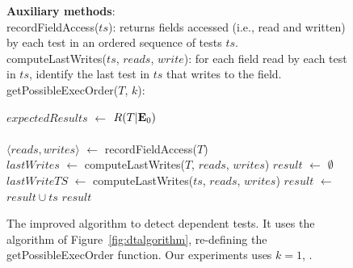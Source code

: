 
\begin{figure}[t]
\textbf{Auxiliary methods}:\\
recordFieldAccess($ts$): returns fields accessed (i.e., read and written) by each test in an ordered sequence of tests $ts$. \\
computeLastWrites($ts$, $reads$, $write$): for each field read by each test in $ts$, identify the last test in $ts$ that writes to the field.\\


getPossibleExecOrder($T$, $k$):\\
\vspace{-5mm}
\begin{algorithmic}[1]
\STATE $\mathit{expectedResults}$ $\leftarrow$ $R(T|\mathbf{E}_0)$\\
\\
\STATE $\langle reads, writes\rangle$ $\leftarrow$ recordFieldAccess($T$)
\\
\STATE $\mathit{lastWrites}$ $\leftarrow$ computeLastWrites($T$, $\mathit{reads}$, $\mathit{writes}$)
\STATE $\mathit{result}$ $\leftarrow$ $\emptyset$
\STATE $\mathit{lastWriteTS}$ $\leftarrow$ computeLastWrites($ts$, $\mathit{reads}$, $\mathit{writes}$)
\vspace{-3mm}
\STATE $\mathit{result}$ $\leftarrow$ $\mathit{result} \cup \mathit{ts}$
\ENDIF
\ENDFOR
\RETURN $\mathit{result}$
\end{algorithmic}

\vspace{-3mm}
\caption {The improved algorithm to detect dependent tests.
It uses the algorithm of Figure~\ref{fig:dtalgorithm}, re-defining the
getPossibleExecOrder function.
Our experiments uses $k=1$, . } 
\label{fig:impralg}
\end{figure}


